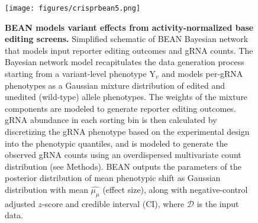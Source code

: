 \documentclass[a4paper, titlepage, openright]{book}
\begin{document}
\begin{figure}
	\centering
	\texttt{[image: figures/crisprbean5.png]}
	\caption[BEAN models variant effects from activity-normalized base editing screens]{\textbf{BEAN models variant effects from activity-normalized base editing screens. } Simplified schematic of BEAN Bayesian network that models input reporter editing outcomes and gRNA counts. The Bayesian network model recapitulates the data generation process starting from a variant-level phenotype Y$_{v}$ and models per-gRNA phenotypes as a Gaussian mixture distribution of edited and unedited (wild-type) allele phenotypes. The weights of the mixture components are modeled to generate reporter editing outcomes. gRNA abundance in each sorting bin is then calculated by discretizing the gRNA phenotype based on the experimental design into the phenotypic quantiles, and is modeled to generate the observed gRNA counts using an overdispersed multivariate count distribution (see Methods). BEAN outputs the parameters of the posterior distribution of mean phenotypic shift as Gaussian distribution with mean $\hat{\mu_{\mu}}$ (effect size), along with negative-control adjusted $z$-score  and credible interval (CI), where $\mathcal{D}$ is the input data.}
	\label{fig:crisprbean5}
\end{figure} 
\end{document}
